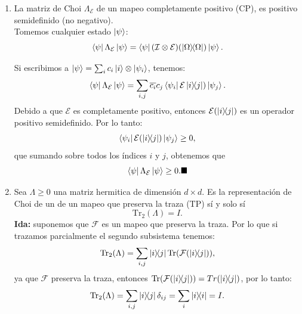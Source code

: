 \documentclass[letterpaper,12pt]{thesisECFM}
\theoremstyle{plain}
\theoremstyle{definition}
\theoremstyle{definition}
\theoremstyle{remark}
\newcommand{\1}{\mathbb{1}}
\begin{document}
\begin{enumerate}
        
    \item La matriz de Choi $\Lambda_{\mathcal{E}}$ de un mapeo completamente positivo (CP), es positivo semidefinido (no negativo).\\ 
     Tomemos cualquier estado $\ket{\psi}$:
    \begin{equation}
    \bra{\psi} \Lambda_{\mathcal{E}} \ket{\psi} = \bra{\psi} (\mathcal{I} \otimes \mathcal{E})(\ketbra{\Omega}) \ket{\psi}.
    \end{equation}
    
    Si escribimos a $\ket{\psi} = \sum_i c_i \ket{i} \otimes \ket{\psi_i}$, tenemos:
    \begin{equation}
    \bra{\psi} \Lambda_{\mathcal{E}} \ket{\psi} = \sum_{i,j} \overline{c_i} c_j \bra{\psi_i} \mathcal{E}\ketbra{i}{j}) \ket{\psi_j}.
    \end{equation}
    Debido a que $\mathcal{E}$ es completamente positivo, entonces $\mathcal{E}(\ketbra{i}{j})$ es un operador positivo semidefinido. Por lo tanto: 
    \begin{equation}
    \bra{\psi_i} \mathcal{E}(\ketbra{i}{j}) \ket{\psi_j} \geq 0,
    \end{equation}
    que sumando sobre todos los índices $i$ y $j$, obtenemos que
    \begin{equation}
    \bra{\psi} \Lambda_{\mathcal{E}} \ket{\psi} \geq 0. \blacksquare
    \end{equation}
    \item Sea $\Lambda \geq0$ una matriz hermitica de dimensión $d \times d$. Es la representación de Choi de un de un mapeo que preserva la traza (TP) sí y solo sí 
    \begin{equation}
        \text{Tr}_2 (\Lambda) = I.
    \end{equation}
    \textbf{Ida:} suponemos que $\mathcal{F}$ es un mapeo que preserva la traza. Por lo que si trazamos parcialmente el segundo subsistema tenemos:
    \begin{equation}
        \text{Tr}_2(\Lambda) = \sum_{i,j}\ketbra{i}{j}\text{Tr}( \mathcal{F}(\ketbra{i}{j})),
    \end{equation}
    ya que $\mathcal{F}$ preserva la traza, entonces $\text{Tr}( \mathcal{F}(\ketbra{i}{j})) = Tr(\ketbra{i}{j})$, por lo tanto:
    \begin{equation}
         \text{Tr}_2(\Lambda) = \sum_{i,j}\ketbra{i}{j} \delta_{ij}= \sum_i \ketbra{i}= I. 
    \end{equation}
    

\end{enumerate}
\end{document}
